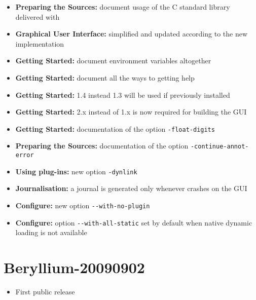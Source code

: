 \begin{itemize}
\item \textbf{Preparing the Sources:} document usage of the C standard library
  delivered with \FramaC
\item \textbf{Graphical User Interface:} simplified and updated according to
  the new implementation
\item \textbf{Getting Started:} document environment variables altogether
\item \textbf{Getting Started:} document all the ways to getting help
\item \textbf{Getting Started:}  1.4 instead 1.3 will be used
  if previously installed
\item \textbf{Getting Started:}  2.x instead of 1.x is now
  required for building the GUI
\item \textbf{Getting Started:} documentation of the option
  \texttt{-float-digits}
\item \textbf{Preparing the Sources:} documentation of the option
  \texttt{-continue-annot-error}
\item \textbf{Using plug-ins:} new option \texttt{-dynlink}
\item \textbf{Journalisation:} a journal is generated only whenever \FramaC
  crashes on the GUI
\item \textbf{Configure:} new option \texttt{-{}-with-no-plugin}
\item \textbf{Configure:} option \texttt{-{}-with-all-static} set by default
  when native dynamic loading is not available
\end{itemize}

\section*{Beryllium-20090902}

\begin{itemize}
\item First public release
\end{itemize}

